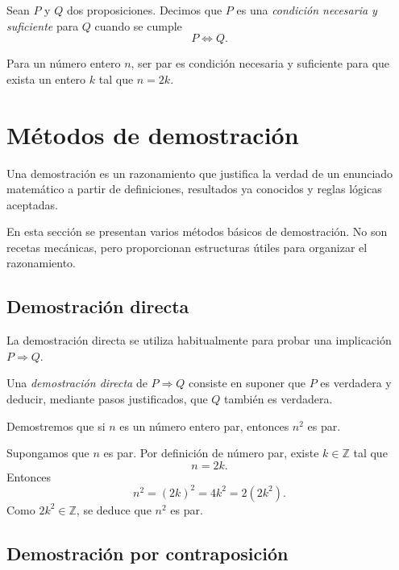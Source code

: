 \begin{definicion}
Sean $P$ y $Q$ dos proposiciones. Decimos que $P$ es una \emph{condición necesaria y suficiente} para $Q$ cuando se cumple
\[
  P\Leftrightarrow Q.
\]
\end{definicion}

\begin{ejemplo}
Para un número entero $n$, ser par es condición necesaria y suficiente para que exista un entero $k$ tal que $n=2k$.
\end{ejemplo}

\section{Métodos de demostración}

Una demostración es un razonamiento que justifica la verdad de un enunciado matemático a partir de definiciones, resultados ya conocidos y reglas lógicas aceptadas.

En esta sección se presentan varios métodos básicos de demostración. No son recetas mecánicas, pero proporcionan estructuras útiles para organizar el razonamiento.

\subsection{Demostración directa}

La demostración directa se utiliza habitualmente para probar una implicación $P\Rightarrow Q$.

\begin{definicion}
Una \emph{demostración directa} de $P\Rightarrow Q$ consiste en suponer que $P$ es verdadera y deducir, mediante pasos justificados, que $Q$ también es verdadera.
\end{definicion}

\begin{ejemplo}
Demostremos que si $n$ es un número entero par, entonces $n^2$ es par.

Supongamos que $n$ es par. Por definición de número par, existe $k\in\mathbb{Z}$ tal que
\[
  n=2k.
\]
Entonces
\[
  n^2=(2k)^2=4k^2=2(2k^2).
\]
Como $2k^2\in\mathbb{Z}$, se deduce que $n^2$ es par.
\end{ejemplo}

\subsection{Demostración por contraposición}

